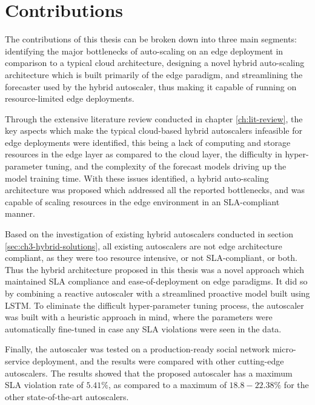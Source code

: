 \section{Contributions}
\label{sec:ch7-contribution}

The contributions of this thesis can be broken down into three main segments: identifying the major bottlenecks of auto-scaling on an edge deployment in comparison to a typical cloud architecture, designing a novel hybrid auto-scaling architecture which is built primarily of the edge paradigm, and streamlining the forecaster used by the hybrid autoscaler, thus making it capable of running on resource-limited edge deployments.\par

Through the extensive literature review conducted in chapter \ref{ch:lit-review}, the key aspects which make the typical cloud-based hybrid autoscalers infeasible  for edge deployments were identified, this being a lack of computing and storage resources in the edge layer as compared to the cloud layer, the difficulty in hyper-parameter tuning, and the complexity of the forecast models driving up the model training time. With these issues identified, a hybrid auto-scaling architecture was proposed which addressed all the reported bottlenecks, and was capable of scaling resources in the edge environment in an SLA-compliant manner.\par

Based on the investigation of existing hybrid autoscalers conducted in section \ref{sec:ch3-hybrid-solutions}, all existing autoscalers are not edge architecture compliant, as they were too resource intensive, or not SLA-compliant, or both. Thus the hybrid architecture proposed in this thesis was a novel approach which maintained SLA compliance and ease-of-deployment on edge paradigms. It did so by combining a reactive autoscaler with a streamlined proactive model built using LSTM. To eliminate the difficult hyper-parameter tuning process, the autoscaler was built with a heuristic approach in mind, where the parameters were automatically fine-tuned in case any SLA violations were seen in the data.\par

Finally, the autoscaler was tested on a production-ready social network micro-service deployment, and the results were compared with other cutting-edge autoscalers. The results showed that the proposed autoscaler has a maximum SLA violation rate of $5.41\%$, as compared to a maximum of $18.8-22.38\%$ for the other state-of-the-art autoscalers.\par

